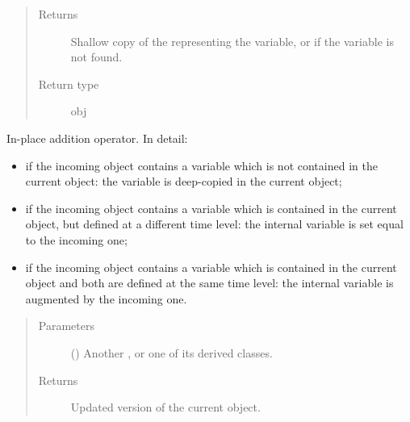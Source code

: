 \documentclass[letterpaper,10pt,english]{sphinxmanual}
\begin{document}
\begin{fulllineitems}
\begin{fulllineitems}
\begin{quote}
\begin{description}
\item[{Returns}] \leavevmode
Shallow copy of the  representing the variable,
or  if the variable is not found.

\item[{Return type}] \leavevmode
obj

\end{description}\end{quote}

\end{fulllineitems}


\begin{fulllineitems}
\label{\detokenize{api:tasmania.storages.grid_data.GridData.__iadd__}}
In-place addition operator. In detail:
\begin{itemize}
\item {} 
if the incoming object contains a variable which is not contained in the current object: the variable is                      deep-copied in the current object;

\item {} 
if the incoming object contains a variable which is contained in the current object, but defined                      at a different time level: the internal variable is set equal to the incoming one;

\item {} 
if the incoming object contains a variable which is contained in the current object and both are defined                      at the same time level: the internal variable is augmented by the incoming one.

\end{itemize}
\begin{quote}\begin{description}
\item[{Parameters}] \leavevmode
{} () \textendash{} Another {\hyperref[\detokenize{api:tasmania.storages.grid_data.GridData}]{}}, or one of its derived classes.

\item[{Returns}] \leavevmode
Updated version of the current object.


\end{description}
\end{quote}
\end{fulllineitems}
\end{fulllineitems}
\end{document}
